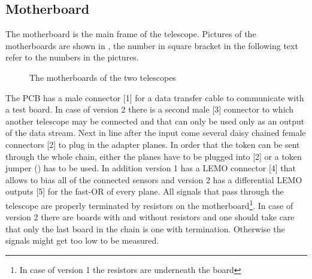 \documentclass[british,11pt,a4paper]{memoir}
\begin{document}
\subsection{Motherboard}\label{s210}
The motherboard is the main frame of the telescope. Pictures of the motherboards are shown in , the number in square bracket in the following text refer to the numbers in the pictures.\par
\begin{figure}[h]
	\centering
	\hfill
	\caption{The motherboards of the two telescopes}
	\label{pmb}
\end{figure}\no
The \ac{PCB} has a male connector [1] for a data transfer cable to communicate with a test board. In case of version 2 there is a second male [3] connector to which another telescope may be connected and that can only be used only as an output of the data stream. Next in line after the input come several daisy chained female connectors [2] to plug in the adapter planes. In order that the token can be sent through the whole chain, either the planes have to be plugged into [2] or a token jumper () has to be used. In addition version 1 has a LEMO connector [4] that allows to bias all of the connected sensors and version 2 has a differential LEMO outputs [5] for the fast-OR of every plane. All signals that pass through the telescope are properly terminated by resistors on the motherboard\footnote{In case of version 1 the resistors are underneath the board}. In case of version 2 there are boards with and without resistors and one should take care that only the last board in the chain is one with termination. Otherwise the signals might get too low to be measured.\\
\end{document}
